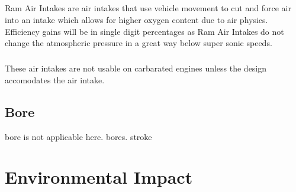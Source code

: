 \documentclass[a4paper,10pt]{report}
\begin{document}
\paragraph*{}Ram Air Intakes are air intakes that use vehicle movement to cut and force air into an intake which allows for higher oxygen content due to air physics. Efficiency gains will be in single digit percentages as Ram Air Intakes do not change the atmospheric pressure in a great way below super sonic speeds.
\paragraph*{}These air intakes are not usable on carbarated engines unless the design accomodates the air intake.
\section{Bore}\Gls{bore} is not applicable here. \glspl{bore}. \Gls{stroke}

\chapter{Environmental Impact}


\printglossaries
\end{document}
